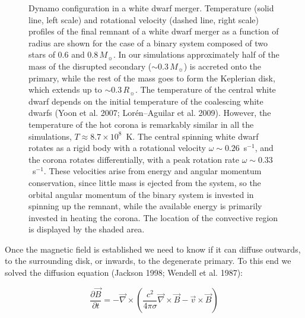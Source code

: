 \documentclass[]{emulateapj}
\begin{document}
\begin{figure}[t]
\vspace{7.5cm}
\begin{center} 
\caption{Dynamo  configuration in  a white  dwarf  merger. Temperature
         (solid  line,  left scale)  and  rotational velocity  (dashed
         line, right scale)  profiles of the final remnant  of a white
         dwarf merger as  a function of radius are  shown for the case
         of a  binary system composed of  two stars of  0.6 and $0.8\,
         M_{\sun}$.  In our simulations approximately half of the mass
         of  the  disrupted   secondary  ($\sim  0.3\,  M_{\sun}$)  is
         accreted onto the primary, while the rest of the mass goes to
         form  the Keplerian  disk, which  extends up  to  $\sim 0.3\,
         R_{\sun}$. The temperature of the central white dwarf depends
         on  the initial  temperature of  the coalescing  white dwarfs
         (Yoon et  al. 2007; Lor\'en--Aguilar et  al.  2009). However,
         the temperature  of the hot  corona is remarkably  similar in
         all the simulations, $T\approx 8.7\times 10^8$~K. The central
         spinning  white  dwarf  rotates   as  a  rigid  body  with  a
         rotational  velocity   $\omega\sim  0.26$~s$^{-1}$,  and  the
         corona  rotates  differentially, with  a  peak rotation  rate
         $\omega\sim  0.33$~s$^{-1}$.   These  velocities  arise  from
         energy and  angular momentum conservation,  since little mass
         is ejected  from the system, so the  orbital angular momentum
         of the binary system is  invested in spinning up the remnant,
         while the  available energy is primarily  invested in heating
         the  corona.   The  location  of  the  convective  region  is
         displayed by the shaded area.}
\end{center}
\label{corona} 
\end{figure} 

Once  the magnetic  field is  established we  need to  know if  it can
diffuse  outwards,  to  the  surrounding  disk,  or  inwards,  to  the
degenerate  primary. To  this  end we  solved  the diffusion  equation
(Jackson  1998; Wendell et al. 1987):

\begin{equation}
\frac{\partial\vec{B}}{\partial t}=-\vec{\nabla}\times
\left(\frac{c^2}{4\pi\sigma}\vec{\nabla}\times\vec{B}-
\vec{v}\times\vec{B}\right)
\end{equation}
\end{document}
